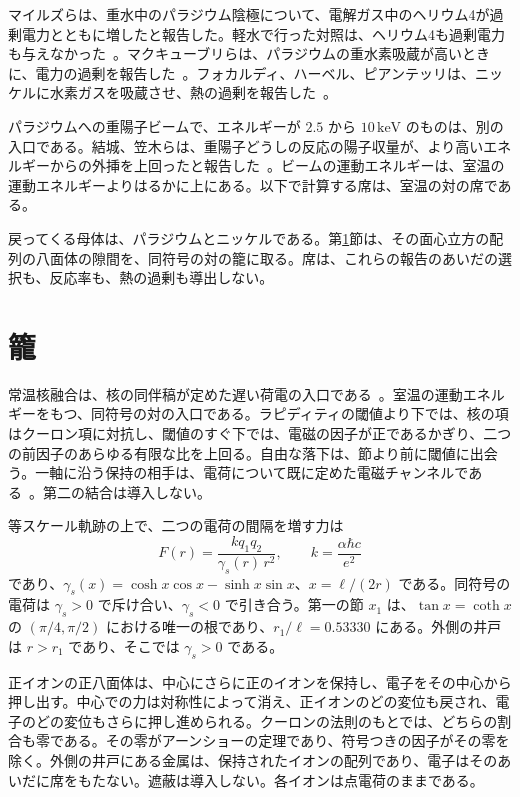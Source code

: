 \documentclass[a4paper]{article}
\begin{document}
マイルズらは、重水中のパラジウム陰極について、電解ガス中のヘリウム4が過剰電力とともに増したと報告した。軽水で行った対照は、ヘリウム4も過剰電力も与えなかった~\cite{miles1993}。マクキューブリらは、パラジウムの重水素吸蔵が高いときに、電力の過剰を報告した~\cite{mckubre1994}。フォカルディ、ハーベル、ピアンテッリは、ニッケルに水素ガスを吸蔵させ、熱の過剰を報告した~\cite{focardi1994}。

パラジウムへの重陽子ビームで、エネルギーが \(2.5\) から \(10\,\mathrm{keV}\) のものは、別の入口である。結城、笠木らは、重陽子どうしの反応の陽子収量が、より高いエネルギーからの外挿を上回ったと報告した~\cite{yuki1998}。ビームの運動エネルギーは、室温の運動エネルギーよりはるかに上にある。以下で計算する席は、室温の対の席である。

戻ってくる母体は、パラジウムとニッケルである。第\ref{sec:cage}節は、その面心立方の配列の八面体の隙間を、同符号の対の籠に取る。席は、これらの報告のあいだの選択も、反応率も、熱の過剰も導出しない。

\section{籠}
\label{sec:cage}

常温核融合は、核の同伴稿が定めた遅い荷電の入口である~\cite{dst-strong}。室温の運動エネルギーをもつ、同符号の対の入口である。ラピディティの閾値より下では、核の項はクーロン項に対抗し、閾値のすぐ下では、電磁の因子が正であるかぎり、二つの前因子のあらゆる有限な比を上回る。自由な落下は、節より前に閾値に出会う。一軸に沿う保持の相手は、電荷について既に定めた電磁チャンネルである~\cite{dst-shell}。第二の結合は導入しない。

等スケール軌跡の上で、二つの電荷の間隔を増す力は
\begin{equation}
\label{eq:force}
F(r)=\frac{k q_1 q_2}{\gamma_s(r)\,r^{2}},
\qquad
k=\frac{\alpha\hbar c}{e^{2}}
\end{equation}
であり、\(\gamma_s(x)=\cosh x\cos x-\sinh x\sin x\)、\(x=\ell/(2r)\) である。同符号の電荷は \(\gamma_s>0\) で斥け合い、\(\gamma_s<0\) で引き合う。第一の節 \(x_1\) は、\(\tan x=\coth x\) の \((\pi/4,\pi/2)\) における唯一の根であり、\(r_1/\ell=0.53330\) にある。外側の井戸は \(r>r_1\) であり、そこでは \(\gamma_s>0\) である。

正イオンの正八面体は、中心にさらに正のイオンを保持し、電子をその中心から押し出す。中心での力は対称性によって消え、正イオンのどの変位も戻され、電子のどの変位もさらに押し進められる。クーロンの法則のもとでは、どちらの割合も零である。その零がアーンショーの定理であり、符号つきの因子がその零を除く。外側の井戸にある金属は、保持されたイオンの配列であり、電子はそのあいだに席をもたない。遮蔽は導入しない。各イオンは点電荷のままである。
\end{document}
